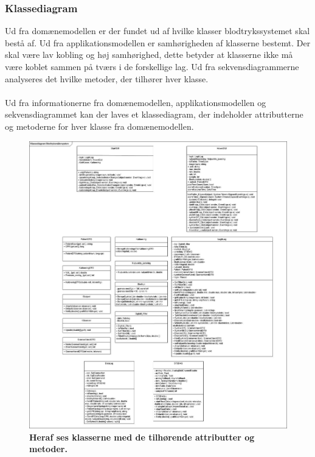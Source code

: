 \subsubsection{Klassediagram}
Ud fra domænemodellen er der fundet ud af hvilke klasser blodtrykssystemet skal bestå af. Ud fra applikationsmodellen er samhørigheden af klasserne bestemt. Der skal være lav kobling og høj samhørighed, dette betyder at klasserne ikke må være koblet sammen på tværs i de forskellige lag. Ud fra sekvensdiagrammerne analyseres det hvilke metoder, der tilhører hver klasse.\\\\
Ud fra informationerne fra domænemodellen, applikationsmodellen og sekvensdiagrammet kan der laves et klassediagram, der indeholder attributterne og metoderne for hver klasse fra domænemodellen.
\begin{figure}[H]
\includegraphics[width =1.0\textwidth , center]{billeder/klassediagram}
\caption{\textbf{Heraf ses klasserne med de tilhørende attributter og metoder.}}
\end{figure}
